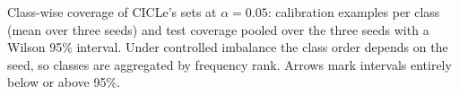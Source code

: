 \begin{table}[t]
  \centering
  \scriptsize
  \setlength{\tabcolsep}{4pt}
  \resizebox{\textwidth}{!}{}
  \caption{Class-wise coverage of CICLe's sets at $\alpha = 0.05$: calibration examples per class (mean over three seeds) and test coverage pooled over the three seeds with a Wilson 95\% interval. Under controlled imbalance the class order depends on the seed, so classes are aggregated by frequency rank. Arrows mark intervals entirely below or above 95\%.}
  \label{tab:classcov}
\end{table}

